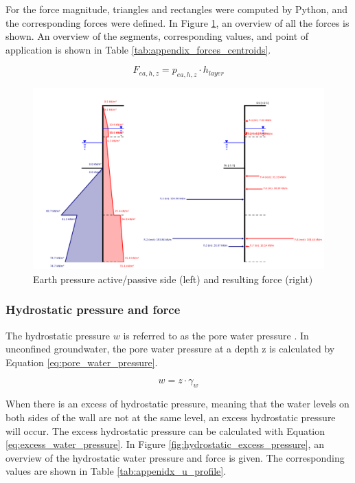 For the force magnitude, triangles and rectangles were computed by Python, and the corresponding forces were defined. In Figure \ref{fig:earth_pressure}, an overview of all the forces is shown. An overview of the segments, corresponding values, and point of application is shown in Table \ref{tab:appendix_forces_centroids}.

\begin{equation}
    F_{ea,h,z} = p_{ea,h,z} \cdot h_{layer}
    \label{eq:earth_force}
\end{equation}

\begin{figure}[H]
    \centering
    \includegraphics[width=0.90\linewidth]{figures/ch8/earth_pressure_force.png}
    \caption{Earth pressure active/passive side (left) and resulting force (right)}
    \label{fig:earth_pressure}
\end{figure}

\newpage

\subsubsection{Hydrostatic pressure and force}

The hydrostatic pressure $w$ is referred to as the pore water pressure \autocite{grabeSheetPilingHandbook2008}. In unconfined groundwater, the pore water pressure at a depth z is calculated by Equation \ref{eq:pore_water_pressure}.

\begin{equation}
    w = z \cdot \gamma_{w}
    \label{eq:pore_water_pressure}
\end{equation}

When there is an excess of hydrostatic pressure, meaning that the water levels on both sides of the wall are not at the same level, an excess hydrostatic pressure will occur. The excess hydrostatic pressure can be calculated with Equation \ref{eq:excess_water_pressure}. In Figure \ref{fig:hydrostatic_excess_pressure}, an overview of the hydrostatic water pressure and force is given. The corresponding values are shown in Table \ref{tab:appenidx_u_profile}. 

